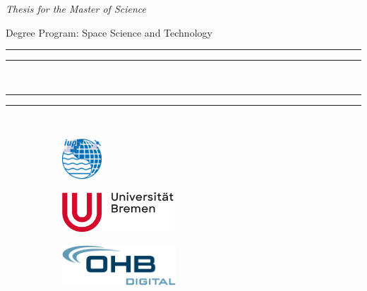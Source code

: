\begin{titlingpage} %
\thispagestyle{empty} 
\begin{center}
\begin{large}
\vspace*{1.5cm}
  \textit{Thesis for the Master of Science}\\
\end{large}
\vspace{2cm}Degree Program: Space Science and Technology \\ 
\vspace{2cm} %
\medskip
\noindent
\rule{\textwidth}{1.6pt}\vspace*{-\baselineskip}\vspace{3.2pt} %
\rule{\textwidth}{0.4pt}\\%
\onehalfspacing%
{\noindent\LARGE\textbf{\thetitle}\par}
\noindent
\rule{\textwidth}{0.4pt}\vspace*{-\baselineskip}\vspace{3.2pt} %
\rule{\textwidth}{1.6pt}\\%
\vspace{3cm}
\theauthor%
\vspace{\fill} %
\begin{figure}[!b]
  \begin{subfigure}{0.15\textwidth}
    \includegraphics[height=1.5cm]{img/res/logoIUP.png}
  \end{subfigure}
  \begin{subfigure}{0.3\textwidth}
    \includegraphics[height=1.5cm]{img/res/logo.png}
  \end{subfigure}\hspace{0.20\textwidth} 
  \begin{subfigure}{0.35\textwidth}
    \centering
    \includegraphics[height=1.5cm]{img/res/logo_ohb_digital.png}
  \end{subfigure}
\end{figure}
\end{center}
\end{titlingpage}
